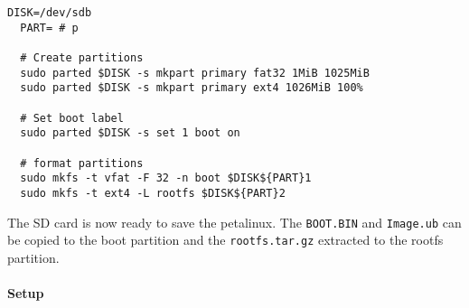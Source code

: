 \begin{lstlisting}[style=bash, caption={}, label=lst:]
  DISK=/dev/sdb
  PART= # p

  # Create partitions
  sudo parted $DISK -s mkpart primary fat32 1MiB 1025MiB
  sudo parted $DISK -s mkpart primary ext4 1026MiB 100%

  # Set boot label
  sudo parted $DISK -s set 1 boot on

  # format partitions
  sudo mkfs -t vfat -F 32 -n boot $DISK${PART}1
  sudo mkfs -t ext4 -L rootfs $DISK${PART}2
\end{lstlisting}

The SD card is now ready to save the petalinux.
The \texttt{BOOT.BIN} and \texttt{Image.ub} can be copied to the boot partition and the \texttt{rootfs.tar.gz} extracted to the rootfs partition.

\paragraph{Setup}
